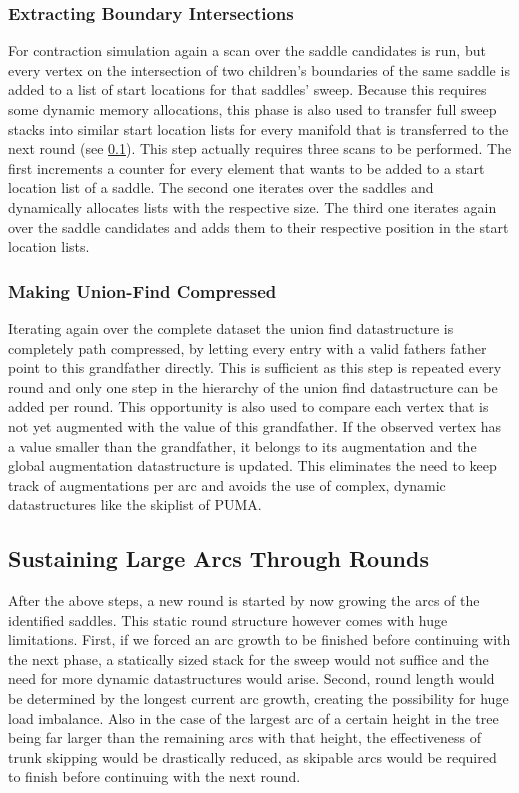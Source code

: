 \documentclass{scrartcl}
\begin{document}
\subsubsection{Extracting Boundary Intersections}
For contraction simulation again a scan over the saddle candidates is run, but every vertex on the intersection of two children's boundaries of the same saddle is added to a list of start locations for that saddles' sweep. Because this requires some dynamic memory allocations, this phase is also used to transfer full sweep stacks into similar start location lists for every manifold that is transferred to the next round (see \ref{ssec:num2}). This step actually requires three scans to be performed. The first increments a counter for every element that wants to be added to a start location list of a saddle. The second one iterates over the saddles and dynamically allocates lists with the respective size. The third one iterates again over the saddle candidates and adds them to their respective position in the start location lists.

\subsubsection{Making Union-Find Compressed}
Iterating again over the complete dataset the union find datastructure is completely path compressed, by letting every entry with a valid fathers father point to this grandfather directly. This is sufficient as this step is repeated every round and only one step in the hierarchy of the union find datastructure can be added per round. This opportunity is also used to compare each vertex that is not yet augmented with the value of this grandfather. If the observed vertex has a value smaller than the grandfather, it belongs to its augmentation and the global augmentation datastructure is updated. This eliminates the need to keep track of augmentations per arc and avoids the use of complex, dynamic datastructures like the skiplist of PUMA.

\subsection{Sustaining Large Arcs Through Rounds}\label{ssec:num2}
After the above steps, a new round is started by now growing the arcs of the identified saddles. This static round structure however comes with huge limitations. First, if we forced an arc growth to be finished before continuing with the next phase, a statically sized stack for the sweep would not suffice and the need for more dynamic datastructures would arise. Second, round length would be determined by the longest current arc growth, creating the possibility for huge load imbalance. Also in the case of the largest arc of a certain height in the tree being far larger than the remaining arcs with that height, the effectiveness of trunk skipping would be drastically reduced, as skipable arcs would be required to finish before continuing with the next round.
\end{document}
